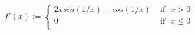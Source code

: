 \documentclass[preview]{standalone}
\begin{document}
\begin{align*}
f'(x) := \begin{cases}2xsin(1/x)-cos(1/x)  &  \text{ if} \ \ \  x > 0 \\0 &  \text{ if} \ \ \ x \leq 0 \\\end{cases}
\end{align*}
\end{document}

